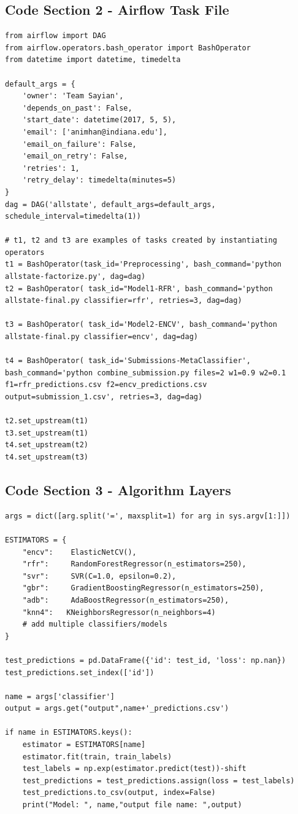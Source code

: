 \documentclass[10pt,onecolumn]{IEEEtran}
\begin{document}
\subsection*{Code Section 2 - Airflow Task File}
{\scriptsize
\begin{Verbatim}
from airflow import DAG
from airflow.operators.bash_operator import BashOperator
from datetime import datetime, timedelta

default_args = {
    'owner': 'Team Sayian',
    'depends_on_past': False,
    'start_date': datetime(2017, 5, 5),
    'email': ['animhan@indiana.edu'],
    'email_on_failure': False,
    'email_on_retry': False,
    'retries': 1,
    'retry_delay': timedelta(minutes=5)
}
dag = DAG('allstate', default_args=default_args, schedule_interval=timedelta(1))

# t1, t2 and t3 are examples of tasks created by instantiating operators
t1 = BashOperator(task_id='Preprocessing', bash_command='python allstate-factorize.py', dag=dag)
t2 = BashOperator( task_id="Model1-RFR', bash_command='python allstate-final.py classifier=rfr', retries=3, dag=dag)

t3 = BashOperator( task_id='Model2-ENCV', bash_command='python allstate-final.py classifier=encv', dag=dag)

t4 = BashOperator( task_id='Submissions-MetaClassifier', bash_command='python combine_submission.py files=2 w1=0.9 w2=0.1 
f1=rfr_predictions.csv f2=encv_predictions.csv output=submission_1.csv', retries=3, dag=dag)

t2.set_upstream(t1)
t3.set_upstream(t1)
t4.set_upstream(t2)
t4.set_upstream(t3)

\end{Verbatim}
}
\subsection*{Code Section 3 - Algorithm Layers}
{\scriptsize
\begin{Verbatim}
args = dict([arg.split('=', maxsplit=1) for arg in sys.argv[1:]])

ESTIMATORS = {
	"encv":    ElasticNetCV(),
	"rfr":     RandomForestRegressor(n_estimators=250),
	"svr":     SVR(C=1.0, epsilon=0.2),
	"gbr":     GradientBoostingRegressor(n_estimators=250),
	"adb":     AdaBoostRegressor(n_estimators=250),
	"knn4":   KNeighborsRegressor(n_neighbors=4)
	# add multiple classifiers/models
}

test_predictions = pd.DataFrame({'id': test_id, 'loss': np.nan})
test_predictions.set_index(['id'])

name = args['classifier']
output = args.get("output",name+'_predictions.csv')

if name in ESTIMATORS.keys():
	estimator = ESTIMATORS[name]
	estimator.fit(train, train_labels)
	test_labels = np.exp(estimator.predict(test))-shift
	test_predictions = test_predictions.assign(loss = test_labels)
	test_predictions.to_csv(output, index=False)
	print("Model: ", name,"output file name: ",output)
\end{Verbatim}
}
\end{document}
